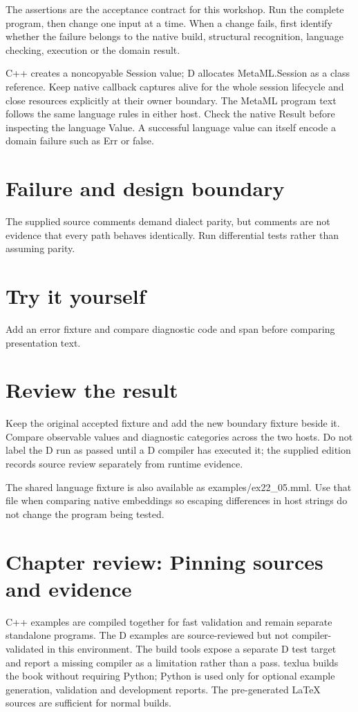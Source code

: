 The assertions are the acceptance contract for this workshop. Run the complete program, then change one input at a time. When a change fails, first identify whether the failure belongs to the native build, structural recognition, language checking, execution or the domain result.

\clearpage
{}
C++ creates a noncopyable Session value; D allocates MetaML.Session as a class reference. Keep native callback captures alive for the whole session lifecycle and close resources explicitly at their owner boundary. The MetaML program text follows the same language rules in either host. Check the native Result before inspecting the language Value. A successful language value can itself encode a domain failure such as Err or false.


\section*{Failure and design boundary}
The supplied source comments demand dialect parity, but comments are not evidence that every path behaves identically. Run differential tests rather than assuming parity.

\section*{Try it yourself}
Add an error fixture and compare diagnostic code and span before comparing presentation text.

\section*{Review the result}
Keep the original accepted fixture and add the new boundary fixture beside it. Compare observable values and diagnostic categories across the two hosts. Do not label the D run as passed until a D compiler has executed it; the supplied edition records source review separately from runtime evidence.

The shared language fixture is also available as examples/ex22\_05.mml. Use that file when comparing native embeddings so escaping differences in host strings do not change the program being tested.

\clearpage
\section*{Chapter review: Pinning sources and evidence}
C++ examples are compiled together for fast validation and remain separate standalone programs. The D examples are source-reviewed but not compiler-validated in this environment. The build tools expose a separate D test target and report a missing compiler as a limitation rather than a pass. texlua builds the book without requiring Python; Python is used only for optional example generation, validation and development reports. The pre-generated LaTeX sources are sufficient for normal builds.

